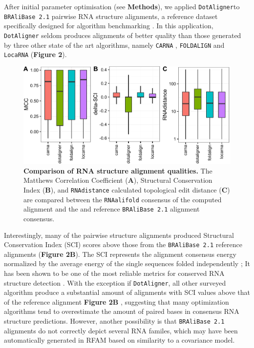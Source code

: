 \documentclass[a4paper,11pt]{article}
\newcommand\dotaligner{\texttt{DotAligner}}
\newcommand\bralibase{\texttt{BRAliBase 2.1}}
\newcommand\locarna{\texttt{LocaRNA}}
\newcommand\foldalign{\texttt{FOLDALIGN}}
\newcommand\carna{\texttt{CARNA}}
\newcommand\rnaalifold{\texttt{RNAalifold}}
\begin{document}
After initial parameter optimisation (see \textbf{Methods}), we applied 
\dotaligner  to  \bralibase{} pairwise RNA structure alignments, a reference 
dataset specifically designed for algorithm benchmarking 
\cite{Gardner15860779,wilm2006enhanced}. In this application, \dotaligner{} seldom 
produces alignments of better quality than those generated by three other 
state of the art algorithms, namely \carna{} \cite{Sorescu2012}, \foldalign{} 
\cite{havgaard2007fast,sundfeld2015foldalign} and \locarna{} \cite{Will17432929}
(\textbf{Figure 2}).\\

\begin{figure}
 \includegraphics[width=\textwidth]{fig2}
 \caption {\textbf{Comparison of RNA structure alignment qualities.}  The
 Matthews Correlation Coefficient (\textbf{A}), Structural Conservation Index  
 (\textbf{B}), and \texttt{RNAdistance} calculated topological edit distance 
 (\textbf{C}) are compared between the \rnaalifold{} consensus of the computed 
 alignment and the and reference \bralibase{} alignment consensus.  }
\end{figure}

Interestingly, many of the pairwise structure alignments produced Structural 
Conservation Index (SCI) scores above those from the \bralibase{} reference alignments 
(\textbf{Figure 2B}). The SCI represents the alignment consensus energy normalized
 by the average energy of the single sequences folded independently \cite{washietl2005fast}; 
It has been shown to be one of the most reliable metrics for conserved RNA structure 
detection \cite{gruber2008strategies}. With the exception if \dotaligner{}, all other 
surveyed algorithm produce a substantial amount of alignments with SCI values 
above that of the reference  alignment \textbf{Figure 2B }, suggesting that many optimization 
algorithms tend to overestimate the amount of paired bases in consensus RNA structure predictions. 
However, another possibility is that \bralibase{} alignments do not correctly depict several RNA familes, 
which may have been automatically generated in RFAM based on similarity to a covariance model.\\
\end{document}
